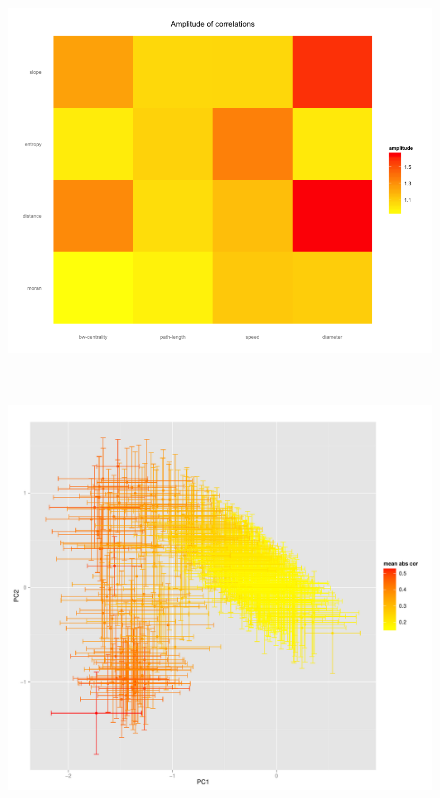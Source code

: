 \documentclass{bmcart}
\begin{document}
\begin{figure}[h!]
\begin{minipage}{0.34\linewidth}
\includegraphics[width=\textwidth]{figures/heatmap_amplCor}
\end{minipage}\\
\begin{minipage}{0.45\linewidth}
\includegraphics[width=\textwidth]{figures/pca_meanAbsCor_errorBars}
\end{minipage}
\begin{minipage}{0.45\linewidth}

\end{minipage}
\end{figure}
\end{document}
